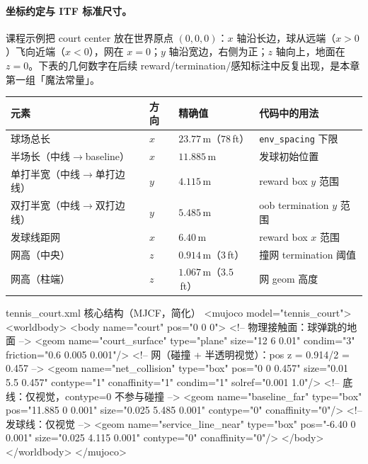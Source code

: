 \paragraph{坐标约定与 ITF 标准尺寸。}课程示例把 court center 放在世界原点 $(0,0,0)$：$x$ 轴沿长边，球从远端（$x>0$）飞向近端（$x<0$），网在 $x=0$；$y$ 轴沿宽边，右侧为正；$z$ 轴向上，地面在 $z=0$。下表的几何数字在后续 reward/termination/感知标注中反复出现，是本章第一组「魔法常量」。

\begin{center}
\small
\begin{tabular}{@{}llll@{}}
\toprule
元素 & 方向 & 精确值 & 代码中的用法 \\
\midrule
球场总长 & $x$ & $23.77$\,m（$78$\,ft） & \verb|env_spacing| 下限 \\
半场长（中线$\to$baseline） & $x$ & $11.885$\,m & 发球初始位置 \\
单打半宽（中线$\to$单打边线） & $y$ & $4.115$\,m & reward box $y$ 范围 \\
双打半宽（中线$\to$双打边线） & $y$ & $5.485$\,m & oob termination $y$ 范围 \\
发球线距网 & $x$ & $6.40$\,m & reward box $x$ 范围 \\
网高（中央） & $z$ & $0.914$\,m（$3$\,ft） & 撞网 termination 阈值 \\
网高（柱端） & $z$ & $1.067$\,m（$3.5$\,ft） & 网 geom 高度 \\
\bottomrule
\end{tabular}
\end{center}

\begin{codebox}[text]{tennis\_court.xml 核心结构（MJCF，简化）}
<mujoco model="tennis_court">
  <worldbody>
    <body name="court" pos="0 0 0">
      <!-- 物理接触面：球弹跳的地面 -->
      <geom name="court_surface" type="plane" size="12 6 0.01"
            condim="3" friction="0.6 0.005 0.001"/>
      <!-- 网（碰撞 + 半透明视觉）：pos z = 0.914/2 = 0.457 -->
      <geom name="net_collision" type="box" pos="0 0 0.457"
            size="0.01 5.5 0.457" contype="1" conaffinity="1"
            condim="1" solref="0.001 1.0"/>
      <!-- 底线：仅视觉，contype=0 不参与碰撞 -->
      <geom name="baseline_far" type="box" pos="11.885 0 0.001"
            size="0.025 5.485 0.001" contype="0" conaffinity="0"/>
      <!-- 发球线：仅视觉 -->
      <geom name="service_line_near" type="box" pos="-6.40 0 0.001"
            size="0.025 4.115 0.001" contype="0" conaffinity="0"/>
    </body>
  </worldbody>
</mujoco>
\end{codebox}

